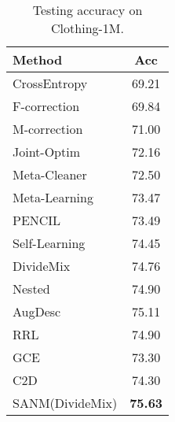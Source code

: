 \documentclass[10pt,twocolumn,letterpaper]{article}
\begin{document}
\begin{table*}[t]
\begin{minipage}{0.66\linewidth}
\begin{minipage}{0.47\linewidth}
\end{minipage}
\hspace{1mm}
\begin{minipage}{0.53\linewidth}
    \centering
    \caption{Testing accuracy on Clothing-1M. 
} 
     \vspace{-1em}
    \centering
    \footnotesize
    \renewcommand{\arraystretch}{1.15}
    {\begin{tabular}{l|c}
    \hline        
        Method                                       &  Acc   \\ \hline
        CrossEntropy                                 &  69.21                 \\ 
        F-correction~\cite{patrini2017making}        &  69.84                 \\ 
        M-correction~\cite{arazo2019unsupervised}    &  71.00                 \\ 
        Joint-Optim~\cite{tanaka2018joint}           &  72.16                 \\ 
        Meta-Cleaner~\cite{zhang2019metacleaner}     &  72.50                 \\ 
        Meta-Learning~\cite{MLNT}                    &  73.47                 \\ 
        PENCIL~\cite{yi2019probabilistic}            &  73.49                 \\ 
        Self-Learning~\cite{han2019deep}             &  74.45                  \\
        DivideMix~\cite{li2020dividemix}             &  74.76                  \\ 
Nested~\cite{Chen_2021_CVPR}   & 74.90  \\
        AugDesc~\cite{nishi2021augmentation} & 75.11 \\
        RRL~\cite{li2021learning}  &  74.90            \\ 
        GCE~\cite{ghosh2021contrastive}  &  73.30            \\ 
        C2D~\cite{zheltonozhskii2022contrast}  &  74.30             \\ \hline
SANM(DivideMix)                                     &  \textbf{75.63}   \\     
        \hline
    \end{tabular}}
    \label{tab:clothing1M}
    

\end{minipage}
\end{minipage}
\end{table*}
\end{document}

